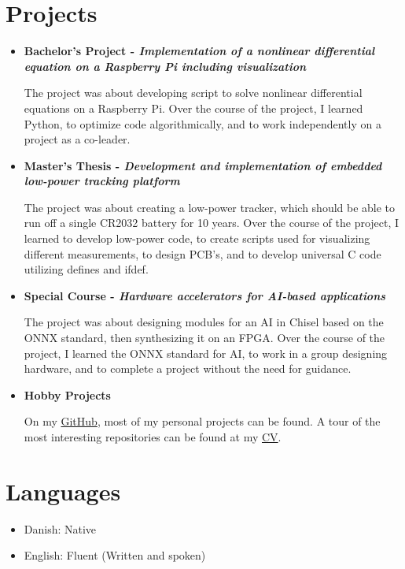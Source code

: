 \section{Projects}
	\begin{itemize}
		\item \textbf{Bachelor's Project - \textit{Implementation of a nonlinear differential equation on a Raspberry Pi including visualization}}

			The project was about developing script to solve nonlinear differential equations on a Raspberry Pi.
			Over the course of the project, I learned Python, to optimize code algorithmically, and to work independently on a project as a co-leader.

		\item \textbf{Master's Thesis - \textit{Development and implementation of embedded low-power tracking platform}}

			The project was about creating a low-power tracker, which should be able to run off a single CR2032 battery for 10 years.
			Over the course of the project, I learned to develop low-power code, to create scripts used for visualizing different measurements, to design PCB's, and to develop universal C code utilizing defines and ifdef.

		\item \textbf{Special Course - \textit{Hardware accelerators for AI-based applications}}

			The project was about designing modules for an AI in Chisel based on the ONNX standard, then synthesizing it on an FPGA.
			Over the course  of the project, I learned the ONNX standard for AI, to work in a group designing hardware, and to complete a project without the need for guidance.

		\item \textbf{Hobby Projects}
			
			On my \href{https://github.com/jondalnas}{GitHub}, most of my personal projects can be found.
			A tour of the most interesting repositories can be found at my \href{https://github.com/jondalnas/CV}{CV}.
	\end{itemize}


\section{Languages}
	\begin{itemize}
		\item Danish: Native
		\item English: Fluent (Written and spoken)
	\end{itemize}

